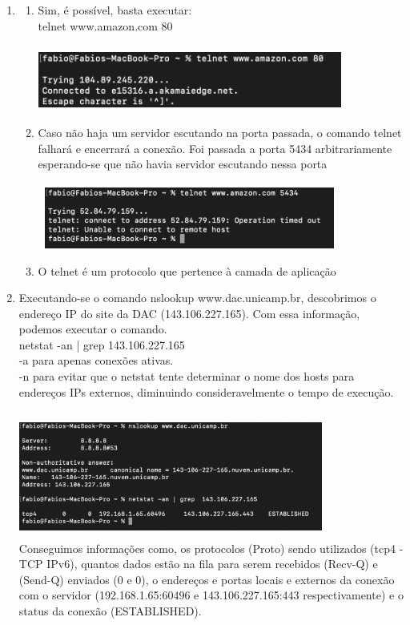 \documentclass[12pt,a4paper]{report}
\begin{document}
\begin{enumerate}
    \item
    \begin{enumerate}
        \item Sim, é possível, basta executar: 
        \\
        telnet www.amazon.com 80
        \\
        \\
        \includegraphics[width=10cm, height=2cm]{4a.png}
        \item Caso não haja um servidor escutando na porta passada, o comando telnet falhará e encerrará a conexão. Foi passada a porta 5434 arbitrariamente esperando-se que não havia servidor escutando nessa porta    
        \\
        \\
        \includegraphics[width=10cm, height=2cm]{4b.png}
        \item O telnet é um protocolo que pertence à camada de aplicação
    \end{enumerate}
    
    \item Executando-se o comando nslookup www.dac.unicamp.br, descobrimos o endereço IP do site da DAC (143.106.227.165). Com essa informação, podemos executar o comando.
    \\
    netstat -an | grep 143.106.227.165
    \\
    -a para apenas conexões ativas.
    \\
    -n para evitar que o netstat tente determinar o nome dos hosts para endereços IPs externos, diminuindo consideravelmente o tempo de execução.
    \\        
    \\
    \includegraphics[width=10cm, height=4cm]{5.png}
    \\
    Conseguimos informações como, os protocolos (Proto) sendo utilizados (tcp4 - TCP IPv6), quantos dados estão na fila para serem recebidos (Recv-Q) e (Send-Q) enviados (0 e 0), o endereços e portas locais e externos da conexão com o servidor (192.168.1.65:60496 e 143.106.227.165:443 respectivamente) e o status da conexão (ESTABLISHED). 
    

\end{enumerate}
\end{document}
